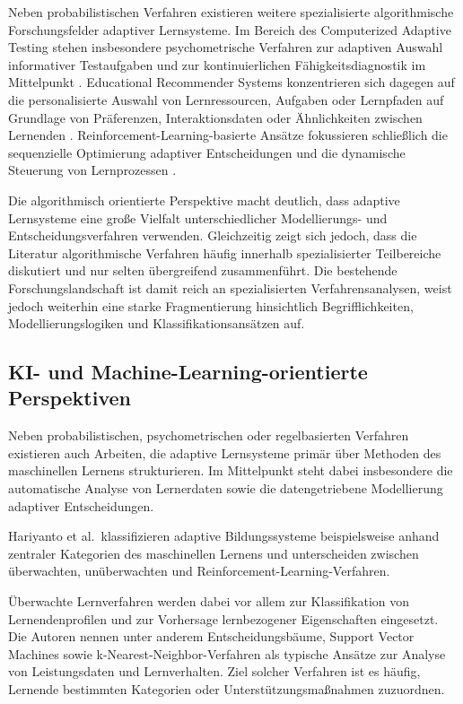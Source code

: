 Neben probabilistischen Verfahren existieren weitere spezialisierte
algorithmische Forschungsfelder adaptiver Lernsysteme. Im Bereich des
Computerized Adaptive Testing stehen insbesondere psychometrische
Verfahren zur adaptiven Auswahl informativer Testaufgaben und zur
kontinuierlichen Fähigkeitsdiagnostik im Mittelpunkt
\citep{Han2018, Liu2024}. Educational Recommender Systems konzentrieren
sich dagegen auf die personalisierte Auswahl von Lernressourcen,
Aufgaben oder Lernpfaden auf Grundlage von Präferenzen,
Interaktionsdaten oder Ähnlichkeiten zwischen Lernenden
\citep{daSilva2023, Nabizadeh2020}. Reinforcement-Learning-basierte
Ansätze fokussieren schließlich die sequenzielle Optimierung adaptiver
Entscheidungen und die dynamische Steuerung von Lernprozessen
\citep{Riedmann2025}.

Die algorithmisch orientierte Perspektive macht deutlich, dass adaptive
Lernsysteme eine große Vielfalt unterschiedlicher Modellierungs- und
Entscheidungsverfahren verwenden. Gleichzeitig zeigt sich jedoch, dass
die Literatur algorithmische Verfahren häufig innerhalb spezialisierter
Teilbereiche diskutiert und nur selten übergreifend zusammenführt. Die
bestehende Forschungslandschaft ist damit reich an spezialisierten
Verfahrensanalysen, weist jedoch weiterhin eine starke Fragmentierung
hinsichtlich Begrifflichkeiten, Modellierungslogiken und
Klassifikationsansätzen auf.

\subsection{KI- und Machine-Learning-orientierte
Perspektiven}\label{ki--und-machine-learning-orientierte-perspektiven}

Neben probabilistischen, psychometrischen oder regelbasierten Verfahren
existieren auch Arbeiten, die adaptive Lernsysteme primär über Methoden
des maschinellen Lernens strukturieren. Im Mittelpunkt steht dabei
insbesondere die automatische Analyse von Lernerdaten sowie die
datengetriebene Modellierung adaptiver Entscheidungen.

Hariyanto et al.~klassifizieren adaptive Bildungssysteme beispielsweise
anhand zentraler Kategorien des maschinellen Lernens und unterscheiden
zwischen überwachten, unüberwachten und
Reinforcement-Learning-Verfahren.

Überwachte Lernverfahren werden dabei vor allem zur Klassifikation von
Lernendenprofilen und zur Vorhersage lernbezogener Eigenschaften
eingesetzt. Die Autoren nennen unter anderem Entscheidungsbäume, Support
Vector Machines sowie k-Nearest-Neighbor-Verfahren als typische Ansätze
zur Analyse von Leistungsdaten und Lernverhalten. Ziel solcher Verfahren
ist es häufig, Lernende bestimmten Kategorien oder
Unterstützungsmaßnahmen zuzuordnen.

